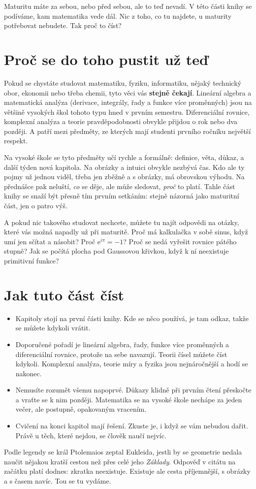 
Maturitu máte za sebou, nebo před sebou, ale to teď nevadí. V této části knihy se podíváme, kam matematika vede dál. Nic z toho, co tu najdete, u maturity potřebovat nebudete. Tak proč to číst?

\section*{Proč se do toho pustit už teď}

Pokud se chystáte studovat matematiku, fyziku, informatiku, nějaký technický obor, ekonomii nebo třeba chemii, tyto věci vás \textbf{stejně čekají}. Lineární algebra a matematická analýza (derivace, integrály, řady a funkce více proměnných) jsou na většině vysokých škol tohoto typu hned v prvním semestru. Diferenciální rovnice, komplexní analýza a teorie pravděpodobnosti obvykle přijdou o rok nebo dva později. A patří mezi předměty, ze kterých mají studenti prvního ročníku největší respekt.

Na vysoké škole se tyto předměty učí rychle a formálně: definice, věta, důkaz, a další týden nová kapitola. Na obrázky a intuici obvykle nezbývá čas. Kdo ale ty pojmy už jednou viděl, třeba jen zběžně a s obrázky, má obrovskou výhodu. Na přednášce pak neluští, \textit{co} se děje, ale může sledovat, \textit{proč} to platí. Tahle část knihy se snaží být přesně tím prvním setkáním: stejně názorná jako maturitní část, jen o patro výš.

A pokud nic takového studovat nechcete, můžete tu najít odpovědi na otázky, které vás možná napadly už při maturitě. Proč má kalkulačka v sobě sinus, když umí jen sčítat a násobit? Proč $\mathrm{e}^{i\pi} = -1$? Proč se nedá vyřešit rovnice pátého stupně? Jak se počítá plocha pod Gaussovou křivkou, když k ní neexistuje primitivní funkce?

\section*{Jak tuto část číst}

\begin{itemize}
  \item Kapitoly stojí na první části knihy. Kde se něco používá, je tam odkaz, takže se můžete kdykoli vrátit.
  \item Doporučené pořadí je lineární algebra, řady, funkce více proměnných a diferenciální rovnice, protože na sebe navazují. Teorii čísel můžete číst kdykoli. Komplexní analýza, teorie míry a fyzika jsou nejnáročnější a hodí se nakonec.
  \item Nemusíte rozumět všemu napoprvé. Důkazy klidně při prvním čtení přeskočte a vraťte se k nim později. Matematika se na vysoké škole nechápe za jeden večer, ale postupně, opakovaným vracením.
  \item Cvičení na konci kapitol mají řešení. Zkuste je, i když se vám nebudou dařit. Právě u těch, které nejdou, se člověk naučí nejvíc.
\end{itemize}

Podle legendy se král Ptolemaios zeptal Eukleida, jestli by se geometrie nedala naučit nějakou kratší cestou než přes celé jeho \textit{Základy}. Odpověď v citátu na začátku platí dodnes: zkratka neexistuje. Existuje ale cesta příjemnější, s obrázky a s časem navíc. Tou se tu vydáme.
